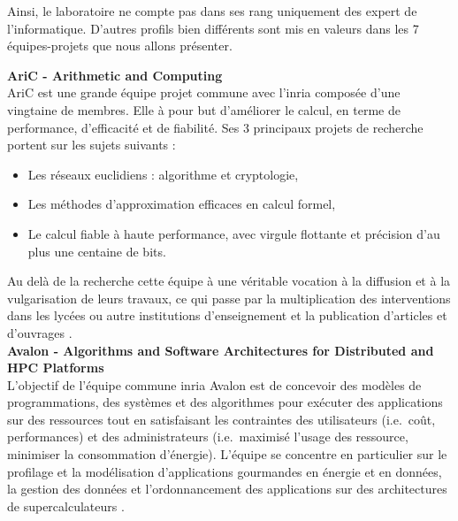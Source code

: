 Ainsi, le laboratoire ne compte pas dans ses rang uniquement des expert de l'informatique. D'autres profils bien différents sont mis en valeurs dans les 7 équipes-projets que nous allons présenter.
\newpage

\textbf{AriC - Arithmetic and Computing}\\
AriC est une grande équipe projet commune avec l'\gls{inria} composée d'une vingtaine de membres. Elle à pour but d'améliorer le calcul, en terme de performance, d'efficacité et de fiabilité. Ses 3 principaux projets de recherche portent sur les sujets suivants :
\begin{itemize}
	\item Les réseaux euclidiens : algorithme et cryptologie,
	\item Les méthodes d'approximation efficaces en calcul formel,
	\item Le calcul fiable à haute performance, avec virgule flottante et précision d'au plus une centaine de bits.
\end{itemize}
Au delà de la recherche cette équipe à une véritable vocation à la diffusion et à la vulgarisation de leurs travaux, ce qui passe par la multiplication des interventions dans les lycées ou autre institutions d'enseignement et la publication d'articles et d'ouvrages \cite{aric}.\\

\textbf{Avalon - Algorithms and Software Architectures for Distributed and HPC Platforms}\\
L'objectif de l'équipe commune \gls{inria} Avalon est de concevoir des modèles de programmations, des systèmes et des algorithmes pour exécuter des applications sur des ressources tout en satisfaisant les contraintes des utilisateurs (i.e.\ coût, performances) et des administrateurs (i.e.\ maximisé l'usage des ressource, minimiser la consommation d'énergie).
L'équipe se concentre en particulier sur le profilage et la modélisation d'applications gourmandes en énergie et en données, la gestion des données et l'ordonnancement des applications sur des architectures de supercalculateurs \cite{avalon}.\\

